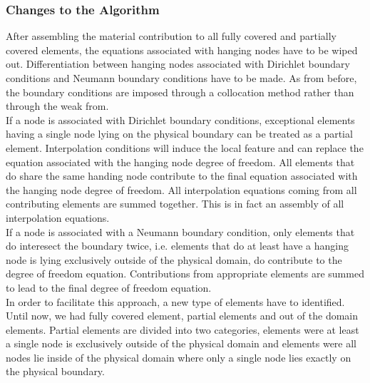 \documentclass[a4paper,12pt]{article}
\begin{document}
\subsubsection{Changes to the Algorithm}
After assembling the material contribution to all fully covered and partially covered elements, the equations associated with hanging nodes have to be wiped out. Differentiation between hanging nodes associated with Dirichlet boundary conditions and Neumann boundary conditions have to be made. As from before, the boundary conditions are imposed through a collocation method rather than through the weak from.\\
If a node is associated with Dirichlet boundary conditions, exceptional elements having a single node lying on the physical boundary can be treated as a partial element. Interpolation conditions will induce the local feature and can replace the equation associated with the hanging node degree of freedom. All elements that do share the same handing node contribute to the final equation associated with the hanging node degree of freedom. All interpolation equations coming from all contributing elements are summed together. This is in fact an assembly of all interpolation equations. \\
If a node is associated with a Neumann boundary condition, only elements that do interesect the boundary twice, i.e. elements that do at least have a hanging node is lying exclusively outside of the physical domain, do contribute to the degree of freedom equation. Contributions from appropriate elements are summed to lead to the final degree of freedom equation.\\
In order to facilitate this approach, a new type of elements have to identified. Until now, we had fully covered element, partial elements and out of the domain elements. Partial elements are divided into two categories, elements were at least a single node is exclusively outside of the physical domain and elements were all nodes lie inside of the physical domain where only a single node lies exactly on the physical boundary. 
\end{document}
